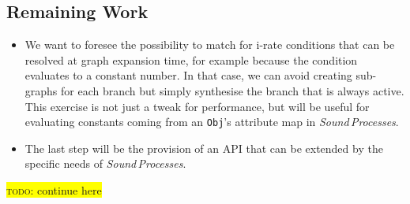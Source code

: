 \documentclass[11pt,a4paper]{article}
\newcommand{\todo}[1]{\colorbox{yellow}{\textsc{todo}: #1}}
\newcommand{\software}[1]{\textit{#1}}
\begin{document}
\subsection{Remaining Work}

\begin{itemize}
\item We want to foresee the possibility to match for i-rate conditions that can be resolved at graph expansion time, for example because the condition evaluates to a constant number. In that case, we can avoid creating sub-graphs for each branch but simply synthesise the branch that is always active. This exercise is not just a tweak for performance, but will be useful for evaluating constants coming from an \Verb!Obj!'s attribute map in \software{Sound\,Processes}.
\item The last step will be the provision of an API that can be extended by the specific needs of \software{Sound\,Processes}.
\end{itemize}

\todo{continue here}

\end{document}
